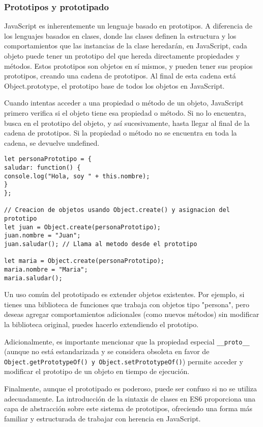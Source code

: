 \documentclass[executivepaper]{article}
\begin{document}
\subsubsection*{Prototipos y prototipado}

JavaScript es inherentemente un lenguaje basado en prototipos. A diferencia de los lenguajes basados en clases, donde las clases definen la estructura y los comportamientos que las instancias de la clase heredarán, en JavaScript, cada objeto puede tener un prototipo del que hereda directamente propiedades y métodos. Estos prototipos son objetos en sí mismos, y pueden tener sus propios prototipos, creando una cadena de prototipos. Al final de esta cadena está Object.prototype, el prototipo base de todos los objetos en JavaScript.

Cuando intentas acceder a una propiedad o método de un objeto, JavaScript primero verifica si el objeto tiene esa propiedad o método. Si no lo encuentra, busca en el prototipo del objeto, y así sucesivamente, hasta llegar al final de la cadena de prototipos. Si la propiedad o método no se encuentra en toda la cadena, se devuelve undefined.

\begin{lstlisting}
let personaPrototipo = {
saludar: function() {
console.log("Hola, soy " + this.nombre);
}
};

// Creacion de objetos usando Object.create() y asignacion del prototipo
let juan = Object.create(personaPrototipo);
juan.nombre = "Juan";
juan.saludar(); // Llama al metodo desde el prototipo

let maria = Object.create(personaPrototipo);
maria.nombre = "Maria";
maria.saludar();
\end{lstlisting}

Un uso común del prototipado es extender objetos existentes. Por ejemplo, si tienes una biblioteca de funciones que trabaja con objetos tipo "persona", pero deseas agregar comportamientos adicionales (como nuevos métodos) sin modificar la biblioteca original, puedes hacerlo extendiendo el prototipo.

Adicionalmente, es importante mencionar que la propiedad especial \lstinline{__proto__} (aunque no está estandarizada y se considera obsoleta en favor de \lstinline{Object.getPrototypeOf() y Object.setPrototypeOf()}) permite acceder y modificar el prototipo de un objeto en tiempo de ejecución.

Finalmente, aunque el prototipado es poderoso, puede ser confuso si no se utiliza adecuadamente. La introducción de la sintaxis de clases en ES6 proporciona una capa de abstracción sobre este sistema de prototipos, ofreciendo una forma más familiar y estructurada de trabajar con herencia en JavaScript.
\end{document}
